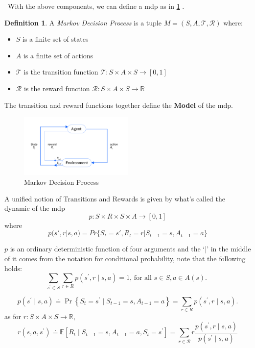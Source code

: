 \documentclass[a4paper,11pt]{report}
\theoremstyle{definition}
\newtheorem{definition}{Definition}[section]
\theoremstyle{plain}
\theoremstyle{remark}  %
\begin{document}
\ With the above components, we can define a \gls{mdp} as in \ref{fig:mdp} .

\begin{definition}
A \textit{Markov Decision Process} is a tuple $M = (S, A, \mathcal{T}, \mathcal{R})$ where:
\begin{itemize}
    \setlength\itemsep{0.01em}
    \item $S$ is a finite set of states
    \item $A$ is a finite set of actions
    \item $\mathcal{T}$ is the transition function $\mathcal{T} : S \times A \times S \rightarrow [0,1]$
    \item $\mathcal{R}$ is the reward function $\mathcal{R} : S \times A \times S \rightarrow \mathbb{R}$
\end{itemize}
\end{definition}
The transition and reward functions together define the \textbf{Model} of
the \gls{mdp}.

\begin{figure}[H]
    \centering
    \includegraphics[width=0.5\textwidth]{images/MDP.png}
    \caption{Markov Decision Process}
    \label{fig:mdp}
\end{figure}

A unified notion of Transitions and Rewards is given by what's called the dynamic of the \gls{mdp}
$$p : S \times R \times S \times A \rightarrow [0, 1]$$
where
$$p(s' , r |s, a) = Pr\{S_t = s' , R_t = r | S_{t-1} = s, A_{t-1}= a\}$$

$p$ is an ordinary deterministic function of four arguments and the ‘|’ in the middle of it 
comes from the notation for conditional probability, note that the following holds:
$$\sum_{s^{\prime} \in S} \sum_{r \in R} p\left(s^{\prime}, r \mid s, a\right)=1 \text {, for all } s \in S, a \in A(s) \text {. }  $$
    
$$
p\left(s^{\prime} \mid s, a\right) \doteq \operatorname{Pr}\left\{S_{t}=s^{\prime} \mid S_{t-1}=s, A_{t-1}=a\right\}=\sum_{r \in R} p\left(s^{\prime}, r \mid s, a\right).
$$
as for \(r: S \times A \times S \rightarrow \mathbb{R}\),
$$
r\left(s, a, s^{\prime}\right) \doteq \mathbb{E}\left[R_{t} \mid S_{t-1}=s, A_{t-1}=a, S_{t}=s^{\prime}\right]=\sum_{r \in \mathcal{R}} r \frac{p\left(s^{\prime}, r \mid s, a\right)}{p\left(s^{\prime} \mid s, a\right)}
$$
\end{document}
